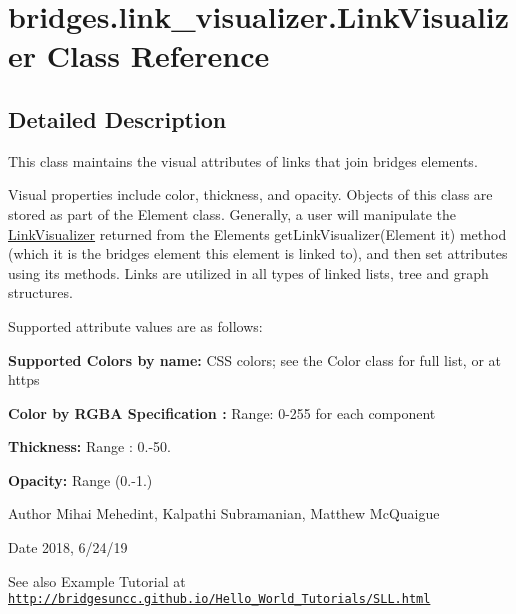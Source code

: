 \hypertarget{classbridges_1_1link__visualizer_1_1_link_visualizer}{}\section{bridges.\+link\+\_\+visualizer.\+Link\+Visualizer Class Reference}
\label{classbridges_1_1link__visualizer_1_1_link_visualizer}


\subsection{Detailed Description}
This class maintains the visual attributes of links that join bridges elements. 

Visual properties include color, thickness, and opacity. Objects of this class are stored as part of the Element class. Generally, a user will manipulate the \hyperlink{classbridges_1_1link__visualizer_1_1_link_visualizer}{Link\+Visualizer} returned from the Element\textquotesingle{}s get\+Link\+Visualizer(\+Element it) method (which it is the bridges element this element is linked to), and then set attributes using its methods. Links are utilized in all types of linked lists, tree and graph structures.

Supported attribute values are as follows\+:

{\bfseries Supported Colors by name\+:} C\+SS colors; see the Color class for full list, or at https 

{\bfseries  Color by R\+G\+BA Specification \+:} Range\+: 0-\/255 for each component 

{\bfseries  Thickness\+: } Range \+: 0.-\/50.

{\bfseries  Opacity\+: } Range (0.-\/1.) 

\begin{DoxyAuthor}{Author}
Mihai Mehedint, Kalpathi Subramanian, Matthew Mc\+Quaigue
\end{DoxyAuthor}
\begin{DoxyDate}{Date}
2018, 6/24/19
\end{DoxyDate}
\begin{DoxySeeAlso}{See also}
Example Tutorial at ~\newline
 \href{http://bridgesuncc.github.io/Hello_World_Tutorials/SLL.html}{\tt http\+://bridgesuncc.\+github.\+io/\+Hello\+\_\+\+World\+\_\+\+Tutorials/\+S\+L\+L.\+html} 
\end{DoxySeeAlso}
